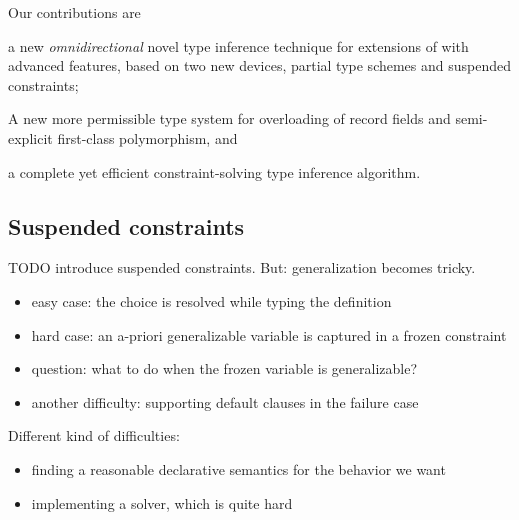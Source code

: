 \documentclass[acmsmall,screen,nonacm]{acmart}
\begin{document}
Our contributions are 
\begin{enumerate*}
\item
  a new \emph{omnidirectional} novel type inference technique for
  extensions of \ML with advanced features, based on two new devices,
  partial type schemes and suspended constraints;


\item
  A new more permissible type system for overloading of record fields and
  semi-explicit first-class polymorphism, and

\item
  a complete yet efficient constraint-solving type inference algorithm.
  
\end{enumerate*}


\begin{version}{}

\subsection {Suspended constraints}


TODO introduce suspended
constraints. But: generalization becomes tricky.
\begin{itemize}
\item easy case: the choice is resolved while typing the definition
\item hard case: an a-priori generalizable variable is captured in a frozen
   constraint 
\item question: what to do when the frozen variable is generalizable?
\item another difficulty: supporting default clauses in the failure case
\end{itemize}

Different kind of difficulties:
\begin{itemize}
\item finding a reasonable declarative semantics for the behavior we want
\item implementing a solver, which is quite hard
\end{itemize}
\end{version}
\end{document}
